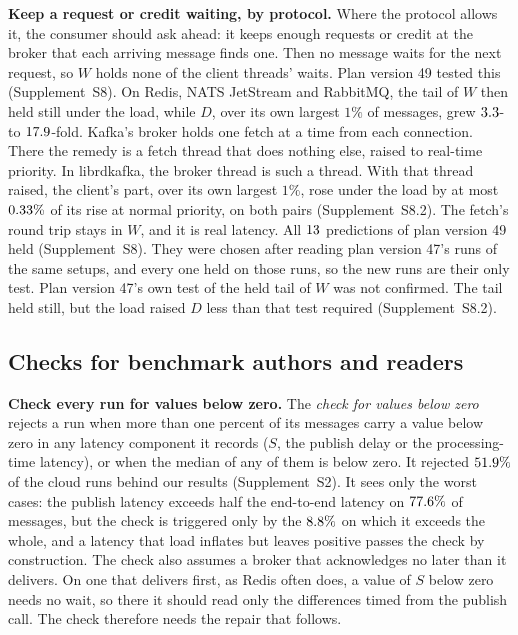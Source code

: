 \documentclass[10pt,journal,compsoc]{IEEEtran}
\newcommand{\kafka}{Kafka}
\newcommand{\redis}{Redis}
\begin{document}
\textbf{Keep a request or credit waiting, by protocol.} Where the protocol allows it, the consumer
should ask ahead: it keeps enough requests or credit at the broker that each arriving message finds one. Then no message waits for
the next request, so $W$ holds none of the client threads' waits. Plan version 49 tested this (Supplement~S8). On \redis{}, NATS JetStream and RabbitMQ, the tail of $W$
then held still under the load, while $D$, over its own largest $1\%$ of messages, grew $3.3$- to $17.9$-fold. \kafka{}'s broker holds one fetch at a time from each connection. There the
remedy is a fetch thread that does nothing else, raised to real-time priority. In librdkafka, the
broker thread is such a thread. With that thread raised, the client's part, over its own largest $1\%$, rose under the load by at most $0.33\%$ of its rise at normal priority, on both pairs (Supplement~S8.2). The fetch's round trip stays in $W$, and it is real latency. All
$13$ predictions of plan version 49 held (Supplement~S8). They were chosen after
reading plan version 47's runs of the same setups, and every one held on those runs, so the new runs
are their only test. Plan version 47's own test of the held tail of $W$ was not confirmed. The tail
held still, but the load raised $D$ less than that test required
(Supplement~S8.2).

\subsection{Checks for benchmark authors and readers}
\label{sec:checklist}

\textbf{Check every run for values below zero.}\label{sec:gate}\label{sec:audit} The \emph{check
for values below zero} rejects a
run when more than one percent of its messages carry a value below zero in any latency component it
records ($S$, the publish delay or the processing-time latency), or when the median of any of them
is below zero. It rejected $51.9\%$ of the cloud runs behind our results (Supplement~S2). It sees only the worst cases: the publish latency
exceeds half the end-to-end latency on $77.6\%$ of messages, but the check is triggered
only by the $8.8\%$ on which it exceeds the whole, and a latency that load inflates
but leaves positive passes the check by construction. The check also assumes a broker that acknowledges no
later than it delivers. On one that delivers first, as \redis{} often does, a value of $S$ below
zero needs no wait, so there it should read only the differences timed from the publish call. The check therefore needs the
repair that follows.
\end{document}
